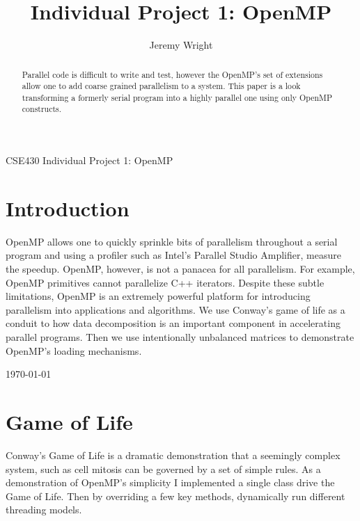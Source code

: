 \documentclass[10pt]{article}
\begin{document}
%
\title{Individual Project 1: OpenMP}
%

\author{Jeremy Wright}

{CSE430 Individual Project 1: OpenMP}

\maketitle


\begin{abstract}
Parallel code is difficult to write and test, however the OpenMP's set of 
extensions allow one to add coarse grained parallelism to a system. This paper 
is a look transforming a formerly serial program into a highly parallel one using 
only OpenMP constructs.
\end{abstract}

\listoffigures


\section{Introduction}

OpenMP allows one to quickly sprinkle bits of parallelism throughout
a serial program and using a profiler such as Intel's Parallel Studio Amplifier, measure 
the speedup.  OpenMP, however, is not a panacea for all parallelism. For example, OpenMP primitives
cannot parallelize C++ iterators.  Despite these 
subtle limitations, OpenMP is an extremely powerful platform for introducing parallelism
into applications and algorithms.  We use Conway's game of life as a conduit to how 
data decomposition is an important component in accelerating parallel programs. Then we 
use intentionally unbalanced matrices to demonstrate OpenMP's loading mechanisms.

\hfill \today

\section{Game of Life}
Conway's Game of Life is a dramatic demonstration that a seemingly complex system,
such as cell mitosis can be governed by a set of simple rules. As a demonstration of
OpenMP's simplicity I implemented a single class drive the Game of Life. Then by 
overriding a few key methods, dynamically run different threading models. 

\end{document}
